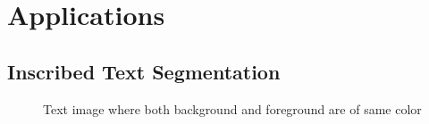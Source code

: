







\section{Applications}

\subsection{Inscribed Text Segmentation}

\begin{figure}[t]
\centering
{}
\label{fig:subfig11}
\caption
{Text image where both background and foreground are of same color}
\label{fig:1}
\end{figure}



